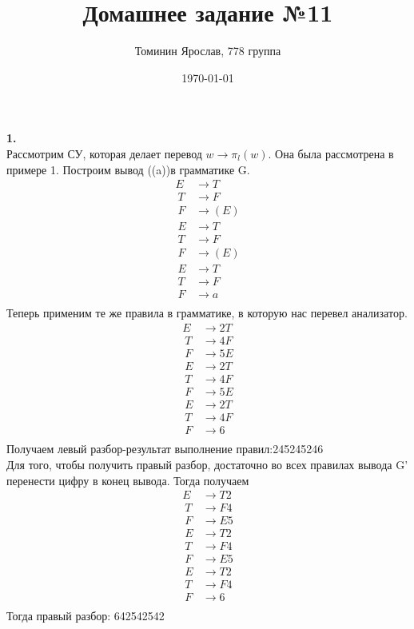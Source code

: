 \documentclass[a4paper,12pt]{article}
\author{Томинин Ярослав, 778 группа}
\title{Домашнее задание №11}
\date{\today}
\begin{document}
 

\maketitle
\newpage
\textbf{1.}\\
Рассмотрим СУ, которая делает перевод $w\to \pi_l(w)$. Она была рассмотрена в примере 1. Построим вывод ((a))в грамматике G. 
\begin{align*}
	E&\to T\\\
	T&\to F\\\
	F&\to (E)\\\
	E&\to T\\\
	T&\to F\\\
	F&\to (E)\\\
	E&\to T\\\
	T&\to F\\\
	F&\to a\\\
\end{align*}
Теперь применим те же правила в грамматике, в которую нас перевел анализатор.\\
\begin{align*}
	E&\to 2T\\\
	T&\to 4F\\\
	F&\to 5E\\\
	E&\to 2T\\\
	T&\to 4F\\\
	F&\to 5E\\\
	E&\to 2T\\\
	T&\to 4F\\\
	F&\to 6\\\
\end{align*}
Получаем левый разбор-результат выполнение правил:245245246\\
Для того, чтобы получить правый разбор, достаточно во всех правилах вывода G' перенести цифру в конец вывода. Тогда получаем \\
\begin{align*}
	E&\to T2\\\
	T&\to F4\\\
	F&\to E5\\\
	E&\to T2\\\
	T&\to F4\\\
	F&\to E5\\\
	E&\to T2\\\
	T&\to F4\\\
	F&\to 6\\\
\end{align*}
Тогда правый разбор: 642542542\\
\end{document}
